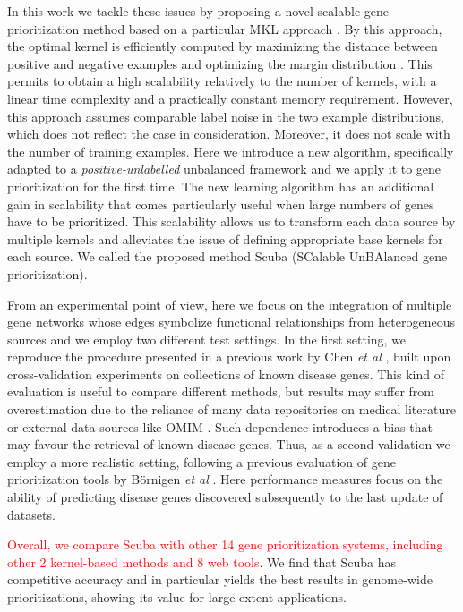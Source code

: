 In this work we tackle these issues by proposing a novel scalable gene prioritization method based on a particular MKL approach \cite{easymkl}. By this approach, the optimal kernel is efficiently computed by maximizing the distance between positive and negative examples and optimizing the margin distribution \cite{komd}. This permits to obtain a high scalability relatively to the number of kernels, with a linear time complexity and a practically constant memory requirement. However, this approach assumes comparable label noise in the two example distributions, which does not reflect the case in consideration. Moreover, it does not scale with the number of training examples. Here we introduce a new algorithm, specifically adapted to a \emph{positive-unlabelled} unbalanced framework and we apply it to gene prioritization for the first time. The new learning algorithm has an additional gain in scalability that comes particularly useful when large numbers of genes have to be prioritized. This scalability allows us to transform each data source by multiple kernels and alleviates the issue of defining appropriate base kernels for each source. We called the proposed method Scuba (SCalable UnBAlanced gene prioritization).

From an experimental point of view, here we focus on the integration of multiple gene networks whose edges symbolize functional relationships from heterogeneous sources and we employ two different test settings. In the first setting, we reproduce the procedure presented in a previous work by Chen \emph{et al} \cite{f3pc}, built upon cross-validation experiments \cite{devijver} on collections of known disease genes. This kind of evaluation is useful to compare different methods, but results may suffer from overestimation due to the reliance of many data repositories on medical literature or external data sources like OMIM \cite{omim}. Such dependence introduces a bias that may favour the retrieval of known disease genes. Thus, as a second validation we employ a more realistic setting, following a previous evaluation of gene prioritization tools by B\"ornigen \emph{et al} \cite{bornigen}. Here performance measures focus on the ability of predicting disease genes discovered subsequently to the last update of datasets.

\textcolor{red}{Overall, we compare Scuba with other 14 gene prioritization systems, including other 2 kernel-based methods and 8 web tools}. We find that Scuba has competitive accuracy and in particular yields the best results in genome-wide prioritizations, showing its value for large-extent applications.
